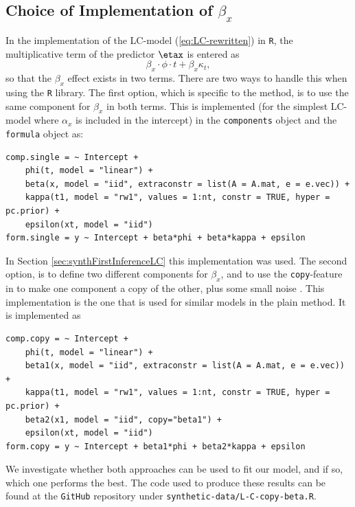 \subsection{Choice of Implementation of $\beta_x$}
In the implementation of the LC-model (\ref{eq:LC-rewritten}) in \texttt{R}, the multiplicative term of the predictor $\etax$ is entered as
\begin{equation}
    \beta_x\cdot\phi \cdot t + \beta_x\kappa_t,
\end{equation}
so that the $\beta_x$ effect exists in two terms. There are two ways to handle this when using the \texttt{R} \inlabru library. The first option, which is specific to the \inlabru method, is to use the same component for $\beta_x$ in both terms. This is implemented (for the simplest LC-model where $\alpha_x$ is included in the intercept) in the \texttt{components} object and the \texttt{formula} object as:
\begin{verbatim}
comp.single = ~ Intercept + 
    phi(t, model = "linear") + 
    beta(x, model = "iid", extraconstr = list(A = A.mat, e = e.vec)) + 
    kappa(t1, model = "rw1", values = 1:nt, constr = TRUE, hyper = pc.prior) + 
    epsilon(xt, model = "iid")
form.single = y ~ Intercept + beta*phi + beta*kappa + epsilon
\end{verbatim}
In Section \ref{sec:synthFirstInferenceLC} this implementation was used. The second option, is to define two different components for $\beta_x$, and to use the \texttt{copy}-feature in \inla to make one component a copy of the other, plus some small noise \parencite{MARTINS201368}. This implementation is the one that is used for similar models in the plain \inla method. It is implemented as
\begin{verbatim}
comp.copy = ~ Intercept + 
    phi(t, model = "linear") + 
    beta1(x, model = "iid", extraconstr = list(A = A.mat, e = e.vec)) + 
    kappa(t1, model = "rw1", values = 1:nt, constr = TRUE, hyper = pc.prior) + 
    beta2(x1, model = "iid", copy="beta1") +
    epsilon(xt, model = "iid")
form.copy = y ~ Intercept + beta1*phi + beta2*kappa + epsilon
\end{verbatim}
We investigate whether both approaches can be used to fit our model, and if so, which one performs the best. The code used to produce these results can be found at the \texttt{GitHub} repository under \texttt{synthetic-data/L-C-copy-beta.R}. 

